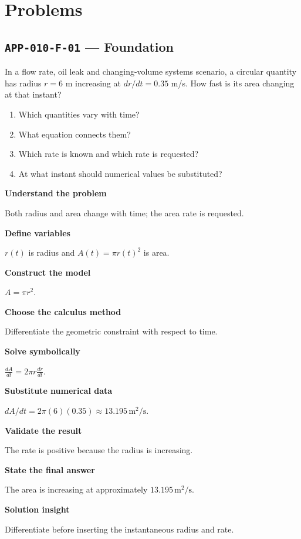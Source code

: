 \documentclass[11pt]{book}
\newcommand{\pid}[1]{\texttt{#1}}
\begin{document}
\section*{Problems}
\subsection*{\pid{APP-010-F-01} — Foundation}
\begin{problembox}
In a flow rate, oil leak and changing-volume systems scenario, a circular quantity has radius $r=6$ m increasing at $dr/dt=0.35$ m/s. How fast is its area changing at that instant?
\end{problembox}
\begin{promptbox}\begin{enumerate}
\item Which quantities vary with time?
\item What equation connects them?
\item Which rate is known and which rate is requested?
\item At what instant should numerical values be substituted?
\end{enumerate}\end{promptbox}
\begin{solutionbox}
\textbf{Understand the problem}\par Both radius and area change with time; the area rate is requested.\par\medskip
\textbf{Define variables}\par $r(t)$ is radius and $A(t)=\pi r(t)^2$ is area.\par\medskip
\textbf{Construct the model}\par $A=\pi r^2$.\par\medskip
\textbf{Choose the calculus method}\par Differentiate the geometric constraint with respect to time.\par\medskip
\textbf{Solve symbolically}\par $\frac{dA}{dt}=2\pi r\frac{dr}{dt}$.\par\medskip
\textbf{Substitute numerical data}\par $dA/dt=2\pi(6)(0.35)\approx 13.195\,\mathrm{m^2/s}$.\par\medskip
\textbf{Validate the result}\par The rate is positive because the radius is increasing.\par\medskip
\textbf{State the final answer}\par The area is increasing at approximately $13.195\,\mathrm{m^2/s}$.\par\medskip
\textbf{Solution insight}\par Differentiate before inserting the instantaneous radius and rate.\par\medskip
\end{solutionbox}
\end{document}
